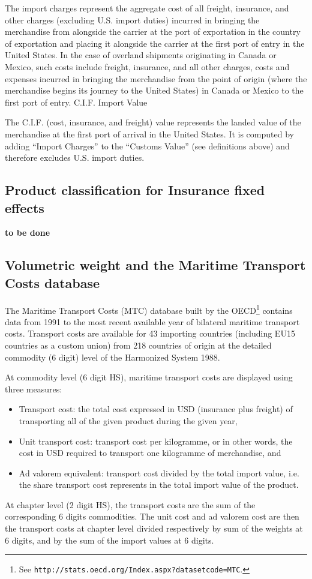 \documentclass[a4paper,11pt]{article}
\begin{document}
The import charges represent the aggregate cost of all freight, insurance, and other charges (excluding U.S. import duties) incurred in bringing the merchandise from alongside the carrier at the port of exportation in the country of exportation and placing it alongside the carrier at the first port of entry in the United States. In the case of overland shipments originating in Canada or Mexico, such costs include freight, insurance, and all other charges, costs and expenses incurred in bringing the merchandise from the point of origin (where the merchandise begins its journey to the United States) in Canada or Mexico to the first port of entry.
C.I.F. Import Value

The C.I.F. (cost, insurance, and freight) value represents the landed value of the merchandise at the first port of arrival in the United States. It is computed by adding ``Import Charges'' to the ``Customs Value'' (see definitions above) and therefore excludes U.S. import duties.

\subsection{Product classification for Insurance fixed effects}
\textbf{to be done}

\subsection{Volumetric weight and the Maritime Transport Costs database}
The Maritime Transport Costs (MTC) database built by the OECD\footnote{See \texttt{http://stats.oecd.org/Index.aspx?datasetcode=MTC}.} contains data from 1991 to the most recent available year of bilateral maritime transport costs. Transport costs are available for 43 importing countries (including EU15 countries as a custom union) from 218 countries of origin at the detailed commodity (6 digit) level of the Harmonized System 1988.

At commodity level (6 digit HS), maritime transport costs are displayed using three measures:
\begin{itemize}
\item Transport cost: the total cost expressed in USD (insurance plus freight) of transporting all of the given product during the given year,
\item  Unit transport cost: transport cost per kilogramme, or in other words, the cost in USD required to transport one kilogramme of merchandise, and
\item Ad valorem equivalent: transport cost divided by the  total import value, i.e. the share transport cost represents in the total import value of the product.
\end{itemize}
At chapter level (2 digit HS), the transport costs are the sum of the corresponding 6 digits commodities. The unit cost and ad valorem cost are then the transport costs at chapter level divided respectively by sum of the weights at 6 digits, and by the sum of the import values at 6 digits.
\end{document}
